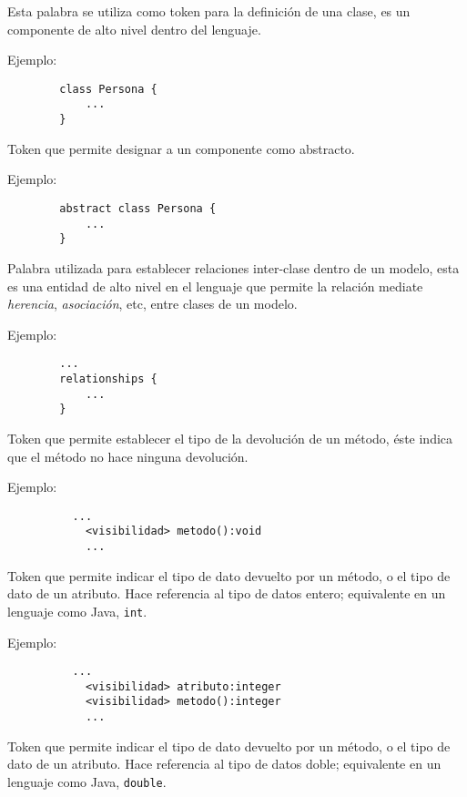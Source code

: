 \begin{description}[align=right,labelwidth=2.5cm]

\item [class] Esta palabra se utiliza como token para la definición de una clase,
	es un componente de alto nivel dentro del lenguaje.

	Ejemplo:
		\begin{lstlisting}
		class Persona {
			...
		}
		\end{lstlisting}

\item [abstract] Token que permite designar a un componente como abstracto.

	Ejemplo:
		\begin{lstlisting}
		abstract class Persona {
			...
		}
		\end{lstlisting}

\item [relationships] Palabra utilizada para establecer relaciones inter-clase
	dentro de un modelo, esta es una entidad de alto nivel en el lenguaje que
	permite la relación mediate \textit{herencia}, \textit{asociación}, etc,
	entre clases de un modelo.

	Ejemplo:
		\begin{lstlisting}
		...
		relationships {
			...
		}
		\end{lstlisting}


\item [void] Token que permite establecer el tipo de la devolución de un
	método, éste indica que el método no hace ninguna	devolución.

	Ejemplo:
		\begin{lstlisting}
		  ...
			<visibilidad> metodo():void
			...
		\end{lstlisting}

\item [integer] Token que permite indicar el tipo de dato devuelto por un
	método, o
	el tipo de dato de un atributo. Hace referencia al tipo de
	datos entero; equivalente en un lenguaje como Java, \texttt{int}.

	Ejemplo:
		\begin{lstlisting}
		  ...
			<visibilidad> atributo:integer
			<visibilidad> metodo():integer
			...
		\end{lstlisting}

\item [double] Token que permite indicar el tipo de dato devuelto por un método, o
	el tipo de dato de un atributo. Hace referencia al tipo de
	datos doble; equivalente en un lenguaje como Java, \texttt{double}.


\end{description}
